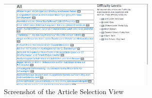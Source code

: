 \begin{figure}
	\caption{Screenshot of the Article Selection View}
	\label{fig:view2}
	\begin{center}
	\includegraphics[width=0.7\textwidth]{Graphics/View2}
\end{center}
\end{figure}